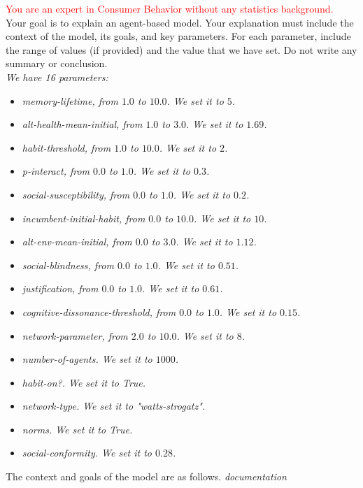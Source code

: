\documentclass[preprint,12pt]{elsarticle}
\begin{document}
\begin{tcolorbox}[colback=white!95!gray, colframe=black, title=Prompt 1 : \textcolor{red}{text} is a feature from the design of experiment. \textit{text} is a part of the prompt changing according to the model and the experiment,  label=box:prompt1]
\textcolor{red}{You are an expert in Consumer Behavior without any statistics background.}\\

Your goal is to explain an agent-based model. Your explanation must include the context of the model, its goals, and key parameters. For each parameter, include the range of values (if provided) and the value that we have set. Do not write any summary or conclusion.\\

\textit{We have 16 parameters:}
\begin{itemize}[noitemsep, topsep=0pt]
    \item \textit{memory-lifetime, from $1.0$ to $10.0$. We set it to $5$.}
    \item \textit{alt-health-mean-initial, from $1.0$ to $3.0$. We set it to $1.69$.}
    \item \textit{habit-threshold, from $1.0$ to $10.0$. We set it to $2$.}
    \item \textit{p-interact, from $0.0$ to $1.0$. We set it to $0.3$.}
    \item \textit{social-susceptibility, from $0.0$ to $1.0$. We set it to $0.2$.}
    \item \textit{incumbent-initial-habit, from $0.0$ to $10.0$. We set it to $10$.}
    \item \textit{alt-env-mean-initial, from $0.0$ to $3.0$. We set it to $1.12$.}
    \item \textit{social-blindness, from $0.0$ to $1.0$. We set it to $0.51$.}
    \item \textit{justification, from $0.0$ to $1.0$. We set it to $0.61$.}
    \item \textit{cognitive-dissonance-threshold, from $0.0$ to $1.0$. We set it to $0.15$.}
    \item \textit{network-parameter, from $2.0$ to $10.0$. We set it to $8$.}
    \item \textit{number-of-agents. We set it to $1000$.}
    \item \textit{habit-on?. We set it to \textit{True}.}
    \item \textit{network-type. We set it to \textit{"watts-strogatz"}.}
    \item \textit{norms. We set it to \textit{True}.}
    \item \textit{social-conformity. We set it to $0.28$.}\\
\end{itemize}

The context and goals of the model are as follows. \textit{documentation}

\end{tcolorbox}
\end{document}
